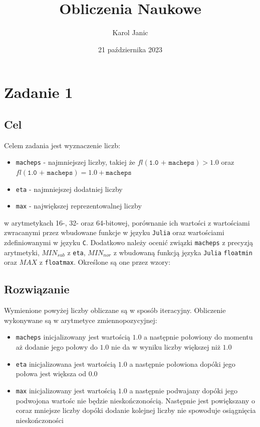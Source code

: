 \documentclass{article}
\title{Obliczenia Naukowe}
\author{Karol Janic}
\date{21 października 2023}
\begin{document}
\begin{titlingpage}
    \maketitle
\end{titlingpage}

\tableofcontents

\newpage

\section{Zadanie 1}
\subsection{Cel}
Celem zadania jest wyznaczenie liczb:
\begin{itemize}
    \item \texttt{macheps} - najmniejszej liczby, takiej że $fl(\texttt{1.0 + macheps}) > 1.0$ oraz $fl(\texttt{1.0 + macheps}) = 1.0 + \texttt{macheps}$
    \item \texttt{eta} - najmniejszej dodatniej liczby
    \item \texttt{max} - największej reprezentowalnej liczby
\end{itemize}
w arytmetykach 16-, 32- oraz 64-bitowej, porównanie ich wartości z wartościami zwracanymi przez wbudowane funkcje w języku \texttt{Julia} oraz wartościami zdefiniowanymi w języku \texttt{C}.
Dodatkowo należy ocenić związki \texttt{macheps} z precyzją arytmetyki, $MIN_{sub}$ z \texttt{eta}, $MIN_{nor}$ z wbudowaną funkcją języka \texttt{Julia} \texttt{floatmin} oraz $MAX$ \newline z \texttt{floatmax}. Określone są one przez wzory:

\subsection{Rozwiązanie}
Wymienione powyżej liczby obliczane są w sposób iteracyjny. Obliczenie wykonywane są w arytmetyce zmiennopozycyjnej:
\begin{itemize}
    \item \texttt{macheps} inicjalizowany jest wartością $1.0$ a następnie połowiony do momentu aż dodanie jego połowy do $1.0$ nie da w wyniku liczby większej niż $1.0$
    \item \texttt{eta} inicjalizowana jest wartością $1.0$ a następnie połowiona dopóki jego połowa jest większa od $0.0$
    \item \texttt{max} inicjalizowany jest wartością $1.0$ a następnie podwajany dopóki jego podwojona wartośc nie będzie nieskończonością. Następnie jest powiększany o coraz mniejsze liczby dopóki dodanie kolejnej liczby nie spowoduje osiągnięcia nieskończoności
\end{itemize}
\end{document}
